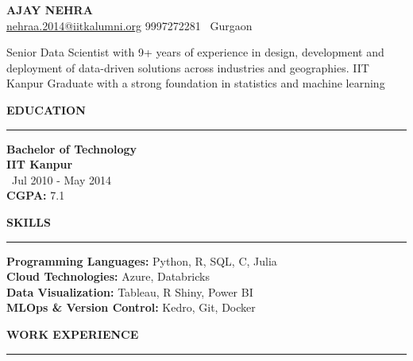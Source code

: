 \documentclass[a4paper,10pt]{article}
\begin{document}
\begin{center}
    \textbf{\LARGE \MakeUppercase{Ajay Nehra}} \\
    \vspace{1mm}
    \href{mailto:nehraa.2014@iitkalumni.org}{nehraa.2014@iitkalumni.org} \hspace{5mm} 9997272281 \hspace{5mm} \faMapMarker \,  Gurgaon
\end{center}

\vspace{1mm} %

Senior Data Scientist with 9+ years of experience in design, development and deployment of data-driven solutions across industries and geographies. IIT Kanpur Graduate with a strong foundation in statistics and machine learning

\vspace{1mm}

\begin{multicols}{2}

\textbf{\LARGE \MakeUppercase{Education}} \\
\vspace{0mm}
\rule{\columnwidth}{0.8pt} %
\textbf{Bachelor of Technology} \\
\textbf{IIT Kanpur} \\
\faCalendar \, Jul 2010 - May 2014 \\
\textbf{CGPA:} 7.1

\columnbreak

\textbf{\LARGE \MakeUppercase{Skills}} \\
\vspace{0mm}
\rule{\columnwidth}{0.8pt} %
\textbf{Programming Languages:} Python, R, SQL, C, Julia\\
\textbf{Cloud Technologies:} Azure, Databricks \\
\textbf{Data Visualization:} Tableau, R Shiny, Power BI \\
\textbf{MLOps \& Version Control:} Kedro, Git, Docker

\end{multicols}

\vspace{1mm} %

\textbf{\LARGE \MakeUppercase{Work Experience}} \\
\vspace{1mm}
\rule{\textwidth}{0.8pt} %
\end{document}
